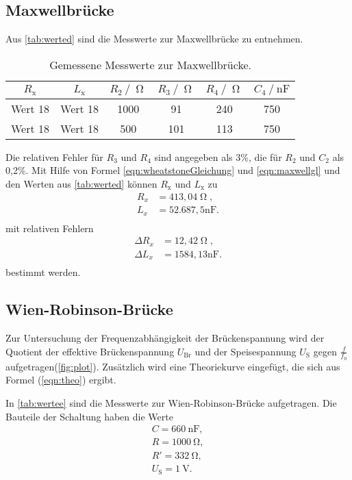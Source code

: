 \subsection{Maxwellbrücke}
Aus \autoref{tab:werted} sind die Messwerte zur Maxwellbrücke zu entnehmen.
\begin{table}[H]
  \centering
  \caption{Gemessene Messwerte zur Maxwellbrücke.}
  \label{tab:werted}
  \begin{tabular}{c c c c c c}
    \toprule
    $R_{\text{x}}$ & $L_{\text{x}}$ & $R_{\text{2}} \:/\: \upOmega$ & $R_{\text{3}} \:/\: \upOmega$ & $R_{\text{4}} \:/\: \upOmega$  & $C_{\text{4}} \:/\: \si{\nano\farad}$ \\
    \midrule
    Wert 18 & Wert 18 & 1000 & 91 & 240 & 750 \\
    Wert 18 & Wert 18 & 500 & 101 & 113 & 750 \\
    \bottomrule
  \end{tabular}
\end{table}
Die relativen Fehler für $R_3$ und $R_4$ sind angegeben als 3\%, die für $R_2$ und $C_2$ als 0,2\%. Mit Hilfe von Formel \autoref{eqn:wheatstoneGleichung} und
\autoref{eqn:maxwellgl} und den Werten aus \autoref{tab:werted} können $R_{\text{x}}$ und $L_{\text{x}}$ zu
\begin{align*}
  R_x &= 413,04 \upOmega, \\
  L_x &= 52.687,5 \si{\nano\farad} . \\
\end{align*}
mit relativen Fehlern
\begin{align*}
  \Delta R_x &= 12,42 \upOmega, \\
  \Delta L_x &= 1584,13 \si{\nano\farad} . \\
\end{align*}
bestimmt werden.


\subsection{Wien-Robinson-Brücke}
Zur Untersuchung der Frequenzabhängigkeit der Brückenspannung wird der Quotient der effektive Brückenspannung $U_{\text{Br}}$ und der Speisespannung $U_{\text{S}}$
gegen $\frac{f}{f_0}$ aufgetragen(\autoref{fig:plot}). Zusätzlich wird eine Theoriekurve eingefügt, die sich aus Formel (\ref{eqn:theo}) ergibt.

In \autoref{tab:wertee} sind die Messwerte zur Wien-Robinson-Brücke aufgetragen. Die Bauteile der Schaltung haben die Werte
\begin{align*}
  C = \SI{660}{\nano\farad},\\
  R = \SI{1000}{\ohm}, \\
  R' = \SI{332}{\ohm}, \\
  U_{\text{S}} = \SI{1}{\volt}. \\
\end{align*}

